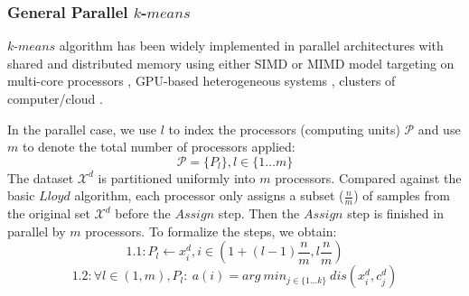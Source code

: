 \documentclass[10pt,journal,compsoc]{IEEEtran}
\begin{document}


%


\subsubsection{General Parallel $k$-$means$}

$k$-$means$ algorithm has been widely implemented in parallel architectures with shared and distributed memory using either SIMD or MIMD model targeting on multi-core processors \cite{dhillon2002data,hadian2014high,bohm2017multi}, GPU-based heterogeneous systems \cite{zechner2009accelerating,li2010speeding,torok2017k}, clusters of computer/cloud \cite{cui2014optimized,haut2017cloud}. 

In the parallel case, we use $l$ to index the processors (computing units) $\mathcal{P}$ and use $m$ to denote the total number of processors applied: $$\mathcal{P} = \{P_l\}, l \in \{1 \ldots m\}$$ The dataset $\mathcal{X}^d$ is partitioned uniformly into $m$ processors. Compared against the basic $Lloyd$ algorithm, each processor only assigns a subset ($\frac{n}{m}$) of samples from the original set $\mathcal{X}^d$ before  the $Assign$ step. Then the $Assign$ step is finished in parallel by $m$ processors. To formalize the steps, we obtain:
$$1.1: P_l \leftarrow {x^d_i}, i \in (1+(l-1)\frac{n}{m},l\frac{n}{m})  $$
$$1.2:\forall l \in (1,m), P_l:\ a(i) = arg\ min_{j\in \{1 \ldots k \} }\ dis({x^d_i}, c^d_j) $$ 
\end{document}

